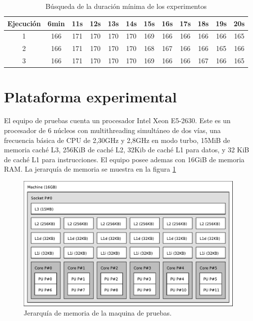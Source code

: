 \begin{table}[h]
	\centering
	\begin{tabular}{c|c|c|c|c|c|c|c|c|c|c|c}

		Ejecución&6min&11s&12s&13s&14s&15s&16s&17s&18s&19s&20s\\

		\hline

		1&166& 171& 170& 170& 170& 169& 166& 166& 166& 166& 165\\

		\hline

		2&166& 171& 170& 170& 170& 168& 167& 166& 166& 165& 166\\

		\hline

		3&166& 171& 170& 170& 170& 169& 166& 166& 167& 166& 165

	\end{tabular}

	\caption{Búsqueda de la duración mínima de los experimentos}

\label{tabla}

\end{table}

\section{Plataforma experimental}

El equipo de pruebas cuenta un procesador Intel Xeon E5-2630. Este es un
procesador de 6 núcleos con multithreading simultáneo de dos vías, una
frecuencia básica de CPU de 2,30GHz y 2,8GHz en modo turbo, 15MiB de memoria
caché L3, 256KiB de caché L2, 32Kib de caché L1 para datos, y 32 KiB de caché L1
para instrucciones. El equipo posee ademas con 16GiB de memoria RAM. La
jerarquía de memoria se muestra en la figura \ref{topoMemoria}

\begin{figure}[!ht]

	\includegraphics[width=\textwidth]{img/topo.pdf}
	\caption{Jerarquía de memoria de la maquina de pruebas.}

	\label{topoMemoria}

\end{figure}

